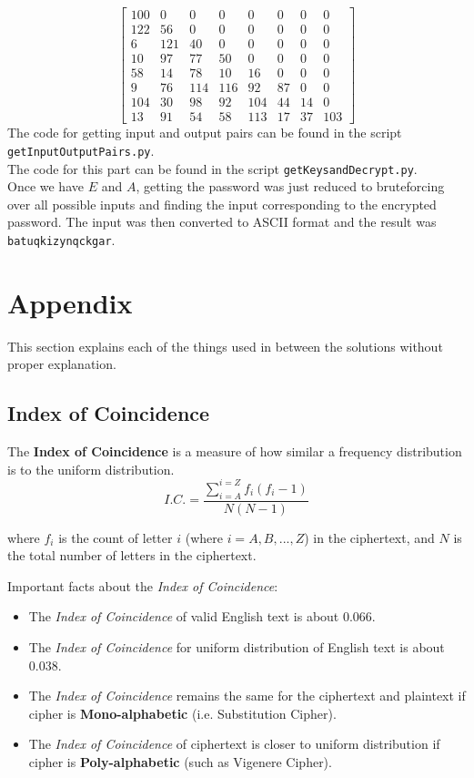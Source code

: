 \documentclass[10pt,twoside]{article}
\begin{document}
 $$\begin{bmatrix}
 100& 0& 0& 0& 0& 0& 0& 0\\
 122&56& 0& 0& 0& 0& 0& 0\\
 6 &121&40& 0& 0& 0& 0& 0\\
  10&97&77&50& 0& 0& 0& 0\\
  58&14&78&10&16& 0& 0& 0\\
 9&76 &114 &116&92&87& 0& 0\\
 104&30&98&92 &104&44&14& 0\\
  13&91&54&58 &113&17&37 &103
  \end{bmatrix}$$
The code for getting input and output pairs can be found in the script \texttt{getInputOutputPairs.py}.\\

The code for this part can be found in the script \texttt{getKeysandDecrypt.py}.\\
Once we have $E$ and $A$, getting the password was just reduced to bruteforcing over all possible inputs and finding the input corresponding to the encrypted password. The input was then converted to ASCII format and the result was \texttt{batuqkizynqckgar}.


\newpage
\section{Appendix}

This section explains each of the things used in between the solutions without proper explanation.

\subsection{Index of Coincidence} \label{ic}

The \textbf{Index of Coincidence} is a measure of how similar a frequency distribution is to the uniform distribution.
$$ I.C. = \frac{\sum_{i=A}^{i=Z} f_i(f_i-1)}{N(N-1)}$$

where $f_i$ is the count of letter $i$ (where $i = A,B,...,Z$) in the ciphertext, and $N$ is the total number of letters in the ciphertext. \newline

Important facts about the \textit{Index of Coincidence}:
\begin{itemize}
  \setlength\itemsep{0em}
    \item The \textit{Index of Coincidence} of valid English text is about $0.066$.
    \item The \textit{Index of Coincidence} for uniform distribution of English text is about $0.038$.
    \item The \textit{Index of Coincidence} remains the same for the ciphertext and plaintext if cipher is \textbf{Mono-alphabetic} (i.e. Substitution Cipher).
    \item The \textit{Index of Coincidence} of ciphertext is closer to uniform distribution if cipher is \textbf{Poly-alphabetic} (such as Vigenere Cipher).
\end{itemize}
\end{document}
